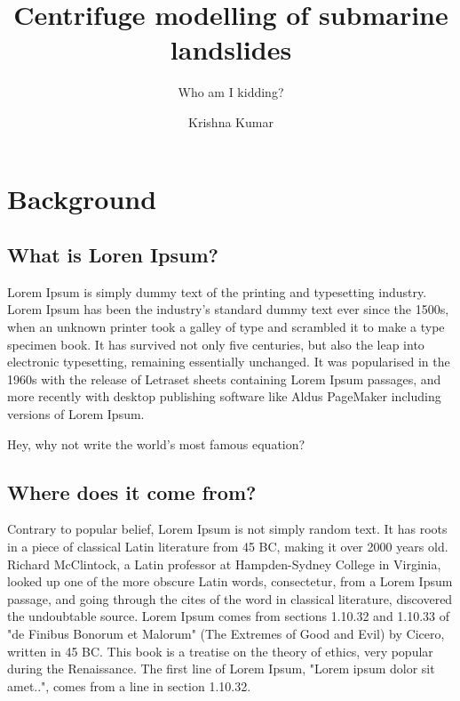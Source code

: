\documentclass[11pt,times]{article}
\title{Centrifuge modelling of submarine landslides} %
\subtitle{Who am I kidding?}
\author{Krishna Kumar} %
\begin{document}
\maketitle

\section{Background} %
\subsection{What is Loren Ipsum?} %

Lorem Ipsum is simply dummy text of the printing and typesetting industry. 
Lorem Ipsum has been the industry's standard dummy text ever since the 1500s, 
when an unknown printer took a galley of type and scrambled it to make a type 
specimen book. It has survived not only five centuries, but also the leap into 
electronic typesetting, remaining essentially unchanged. It was popularised in 
the 1960s with the release of Letraset sheets containing Lorem Ipsum passages, 
and more recently with desktop publishing software like Aldus PageMaker 
including versions of Lorem Ipsum.

Hey, why not write the world's most famous equation?


\subsection{Where does it come from?}  %

Contrary to popular belief, Lorem Ipsum is not simply random text. It has roots 
in a piece of classical Latin literature from 45 BC, making it over 2000 years 
old. Richard McClintock, a Latin professor at Hampden-Sydney College in 
Virginia, looked up one of the more obscure Latin words, consectetur, from a 
Lorem Ipsum passage, and going through the cites of the word in classical 
literature, discovered the undoubtable source. Lorem Ipsum comes from sections 
1.10.32 and 1.10.33 of "de Finibus Bonorum et Malorum" (The Extremes of Good 
and Evil) by Cicero, written in 45 BC. This book is a treatise on the theory of 
ethics, very popular during the Renaissance. The first line of Lorem Ipsum, 
"Lorem ipsum dolor sit amet..", comes from a line in section 1.10.32.
\end{document}
